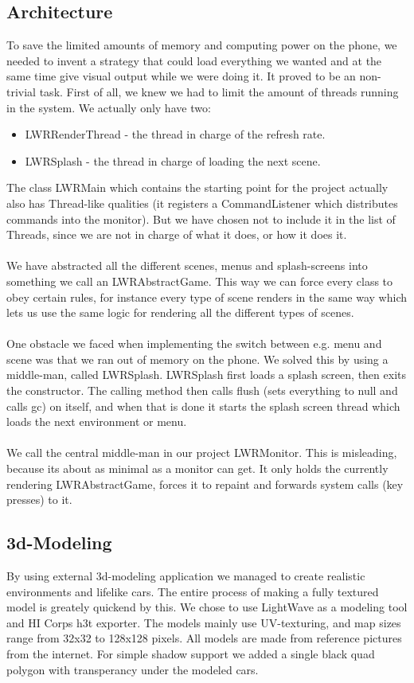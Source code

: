 \documentclass{acmsiggraph}               %
\begin{document}
\subsection{Architecture}
To save the limited amounts of memory and computing power on the phone, we needed to invent a strategy 
that could load everything we wanted and at the same time give visual output while we were doing it. It 
proved to be an non-trivial task. First of all, we knew we had to limit the amount of threads running in 
the system. We actually only have two:
\begin{itemize}
    \item LWRRenderThread - the thread in charge of the refresh rate.
    \item LWRSplash - the thread in charge of loading the next scene.
\end{itemize}

The class LWRMain which contains the starting point for the project actually also has Thread-like qualities 
(it registers a CommandListener which distributes commands into the monitor). But we have chosen not to include 
it in the list of Threads, since we are not in charge of what it does, or how it does it.
\\\\
We have abstracted all the different scenes, menus and splash-screens into something we call an LWRAbstractGame. 
This way we can force every class to obey certain rules, for instance every type of scene renders in the same way 
which lets us use the same logic for rendering all the different types of scenes. 
\\\\
One obstacle we faced when implementing the switch between e.g. menu and scene was that we ran out of memory on the phone. 
We solved this by using a middle-man, called LWRSplash. LWRSplash first loads a splash screen, then exits the constructor. 
The calling method then calls flush (sets everything to null and calls gc) on itself, and when that is done it starts the 
splash screen thread which loads the next environment or menu.
\\\\
We call the central middle-man in our project LWRMonitor. This is misleading, because its about as minimal 
as a monitor can get. It only holds the currently rendering LWRAbstractGame, forces it to repaint and forwards 
system calls (key presses) to it.


\subsection{3d-Modeling}
By using external 3d-modeling application we managed to create realistic environments
and lifelike cars. The entire process of making a fully textured model is greately 
quickend by this. We chose to use LightWave as a modeling tool and HI Corps h3t exporter.
The models mainly use UV-texturing, and map sizes range from 32x32 to 128x128 pixels.
All models are made from reference pictures from the internet. 
For simple shadow support we added a single black quad polygon with transperancy 
under the modeled cars. 
\end{document}
